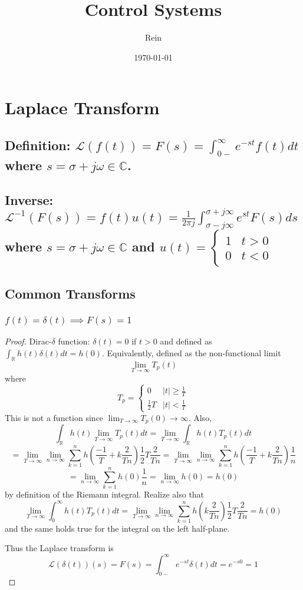 \documentclass[11pt]{article}
\title{Control Systems}
\author{Rein}
\date{\today}
\newcommand{\comps}{\mathbb{C}}
\newcommand{\reals}{\mathbb{R}}
\newcommand{\abs}[1]{\left\lvert #1 \right\rvert}%
\begin{document}
	\maketitle
	\tableofcontents

\section{Laplace Transform}
\subsection{Definition: $\mathcal{L}(f(t)) = F(s) = \int_{0-}^{\infty} e^{-st}f(t) dt$ where $s = \sigma + j \omega \in \comps$. }
\subsection{Inverse: $\mathcal{L}^{-1}(F(s)) = f(t)u(t) =  \frac{1}{2 \pi j}\int_{\sigma - j \infty}^{\sigma + j \infty} e^{st} F(s) ds $ where $s = \sigma + j \omega \in \comps$ and $u(t) = \begin{cases}
		1 & t > 0 \\ 0 & t < 0
\end{cases}$}

\subsection{Common Transforms}
\subsubsection{$f(t) = \delta(t) \implies F(s) = 1$}
\begin{proof}
	

	Dirac-$\delta$ function: $\delta(t) =  0$ if $ t > 0 $ and defined as
	$\int_{\reals} h(t) \delta(t) dt = h(0)$. Equivalently, defined as the non-functional limit 
	\[\lim_{T \to \infty} T_p(t)\] where \[T_p = \begin{cases}
		0 & \abs{t} \geq \frac{1}{T} \\ \frac{1}{2}T & \abs{t} < \frac{1}{T}
	\end{cases}\] This is not a function since $\lim_{T \to \infty} T_p(0) \to \infty$. Also,
\[\int_{\reals} h(t) \lim_{T \to \infty} T_p(t) dt = \lim_{T \to \infty} \int_{\reals} h(t)  T_p(t)  dt \]\[=  \lim_{T \to \infty} \lim_{n \to \infty} \sum_{k = 1}^{n} h(\frac{-1}{T} + k \frac{2}{Tn})\frac{1}{2}T \frac{2}{Tn} =  \lim_{T \to \infty} \lim_{n \to \infty}\sum_{k = 1}^{n} h(\frac{-1}{T} + k \frac{2}{Tn}) \frac{1}{n} \]\[=  \lim_{n \to \infty} \sum_{k = 1}^n h(0) \frac{1}{n} = \lim_{n \to \infty}h(0) = h(0) \] by definition of the Riemann integral. Realize also that 
\[\lim_{T \to \infty} \int_{0}^{\infty} h(t)  T_p(t)  dt = \lim_{T \to \infty} \lim_{n \to \infty} \sum_{k = 1}^{n} h( k \frac{2}{Tn})\frac{1}{2}T \frac{2}{Tn} = h(0)\]
and the same holds true for the integral on the left half-plane. 

Thus the Laplace transform is
\[\mathcal{L}(\delta(t))(s) = F(s) = \int_{0-}^{\infty} e^{-st}\delta(t)  dt = e^{-s0} = 1 \]
\end{proof}
\end{document}

